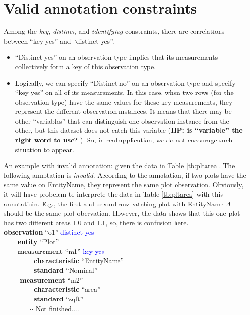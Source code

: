 \documentclass[10pt]{article}
\begin{document}
\section{Valid annotation constraints}
Among the {\em key}, {\em distinct}, and {\em identifying} constraints,
there are correlations between ``key yes'' and ``distinct yes''.
\begin{itemize}
\item ``Distinct yes'' on an observation type implies that its measurements collectively form a key of this observation type.
\item Logically, we can specify ``Distinct no'' on an observation type and specify ``key yes'' on all of its measurements.
In this case, when two rows (for the observation type) have the same values for these key measurements, they represent the different observation instances. It means that there may be other ``variables'' that can distinguish one observation instance from the other, but this dataset does not catch this variable ({\bf HP: is ``variable'' the right word to use? }). So, in real application, we do not encourage such situation to appear. 
\end{itemize}

An example with invalid annotation: given the data in Table \ref{tb:pltarea}. The following annotation is {\em invalid}.
According to the annotation, if two plots have the same value on EntityName, they represent the same plot observation. 
Obviously, it will have probelem to interprete the data in Table \ref{tb:pltarea} with this annotatioin. 
E.g., the first and second row catching plot with EntityName $A$ should be the same plot obervation.
However, the data shows that this one plot has two different areas $1.0$ and $1.1$, so, there is confusion here.
\\

\noindent
{\bf observation} ``o1''  \textcolor{blue}{distinct yes}\\
\verb|    |{\bf  entity} ``Plot''\\
\verb|    |{\bf measurement} ``m1'' \textcolor{blue}{key yes}\\
\verb|        | {\bf characteristic} ``EntityName'' \\
\verb|        | {\bf standard} ``Nominal''\\
\verb|    | {\bf measurement} ``m2''\\
\verb|        | {\bf characteristic} ``area'' \\
\verb|        | {\bf standard} ``sqft''\\
\verb|       |$\cdots$ Not finished....
\end{document}
